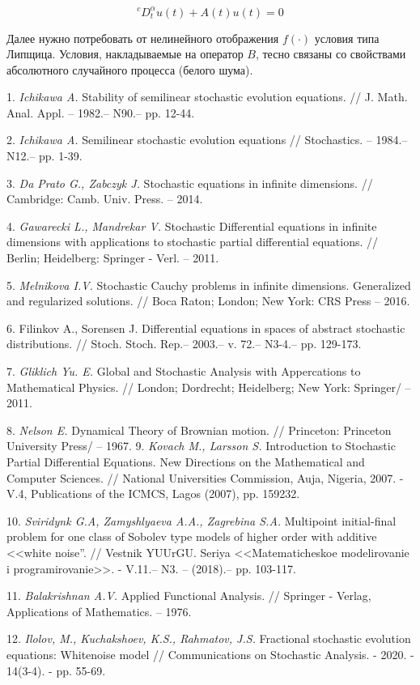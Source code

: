 $$^{c}D_{t}^{\alpha}u(t)+A(t)u(t)=0$$

Далее нужно потребовать от нелинейного отображения $f(\cdot)$ условия типа Липщица. Условия, накладываемые на оператор $B$, тесно связаны со свойствами абсолютного случайного процесса (белого шума).









\litlist

1.	{\it Ichikawa A.} Stability of semilinear stochastic evolution equations. // J. Math. Anal. Appl. – 1982.– N90.– pp. 12-44.

2.	{\it Ichikawa A.} Semilinear stochastic evolution equations // Stochastics. – 1984.– N12.– pp. 1-39.

3.	{\it Da Prato G., Zabczyk J.} Stochastic equations in infinite dimensions. // Cambridge: Camb. Univ. Press. – 2014.

4.	{\it Gawarecki L., Mandrekar V.} Stochastic Differential equations in infinite dimensions with applications to stochastic partial differential equations. // Berlin; Heidelberg: Springer - Verl. – 2011.

5.	{\it Melnikova I.V.} Stochastic Cauchy problems in infinite dimensions. Generalized and regularized solutions. // Boca Raton; London; New York: CRS Press – 2016.

6.	{Filinkov A., Sorensen J.}  Differential equations in spaces of abstract stochastic distributions. // Stoch. Stoch. Rep.– 2003.– v. 72.– N3-4.– pp. 129-173.

7.	{\it Gliklich Yu. E.} Global and Stochastic Analysis with Appercations to Mathematical Physics. // London; Dordrecht; Heidelberg; New York: Springer/ – 2011.

8.	{\it Nelson E.} Dynamical Theory of Brownian motion. // Princeton: Princeton University Press/ – 1967.
9.	{\it Kovach M., Larsson S.} Introduction to Stochastic Partial Differential Equations. New Directions on the Mathematical and Computer Sciences. // National Universities Commission, Auja, Nigeria, 2007. -V.4, Publications of the ICMCS, Lagos (2007), pp. 159232.

10.	{\it Sviridynk G.A, Zamyshlyaeva A.A., Zagrebina S.A.} Multipoint initial-final problem for one class of Sobolev type models of higher order with additive <<white noise”. // Vestnik YUUrGU. Seriya <<Matematicheskoe modelirovanie i programirovanie>>. - V.11.– N3. – (2018).– pp. 103-117.

11.	{\it Balakrishnan A.V.} Applied Functional Analysis. // Springer - Verlag, Applications of Mathematics. – 1976.

12. {\it Ilolov, M., Kuchakshoev, K.S., Rahmatov, J.S.} Fractional stochastic evolution equations: Whitenoise model // Communications on Stochastic Analysis. - 2020. - 14(3-4). - pp. 55-69.


